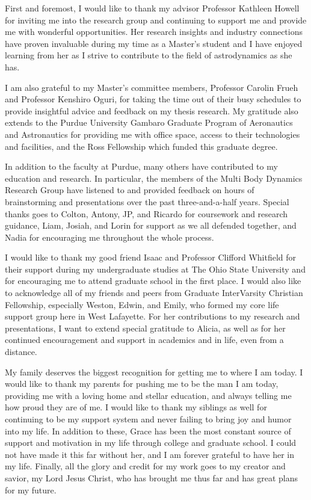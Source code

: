 {
\begin{acknowledgments}
    First and foremost, I would like to thank my advisor Professor Kathleen Howell for inviting me
    into the research group and continuing to support me and provide me with wonderful
    opportunities. Her research insights and industry connections have proven invaluable during my
    time as a Master's student and I have enjoyed learning from her as I strive to contribute to
    the field of astrodynamics as she has.

    I am also grateful to my Master's committee members, Professor Carolin Frueh and Professor
    Kenshiro Oguri, for taking the time out of their busy schedules to provide insightful advice
    and feedback on my thesis research. My gratitude also extends to the Purdue University Gambaro
    Graduate Program of Aeronautics and Astronautics for providing me with office space, access to
    their technologies and facilities, and the Ross Fellowship which funded this graduate degree.

    In addition to the faculty at Purdue, many others have contributed to my education and
    research. In particular, the members of the Multi Body Dynamics Research Group have listened
    to and provided feedback on hours of brainstorming and presentations over the past
    three-and-a-half years. Special thanks goes to Colton, Antony, JP, and Ricardo for coursework
    and research guidance, Liam, Josiah, and Lorin for support as we all defended together, and
    Nadia for encouraging me throughout the whole process.

    I would like to thank my good friend Isaac and Professor Clifford Whitfield for their support
    during my undergraduate studies at The Ohio State University and for encouraging me to attend
    graduate school in the first place. I would also like to acknowledge all of my friends and
    peers from Graduate InterVarsity Christian Fellowship, especially Weston, Edwin, and Emily,
    who formed my core life support group here in West Lafayette. For her contributions to my
    research and presentations, I want to extend special gratitude to Alicia, as well as for her
    continued encouragement and support in academics and in life, even from a distance.

    My family deserves the biggest recognition for getting me to where I am today. I would like to
    thank my parents for pushing me to be the man I am today, providing me with a loving home and
    stellar education, and always telling me how proud they are of me. I would like to thank my
    siblings as well for continuing to be my support system and never failing to bring joy and
    humor into my life. In addition to these, Grace has been the most constant source of support
    and motivation in my life through college and graduate school. I could not have made it this
    far without her, and I am forever grateful to have her in my life. Finally, all the glory and
    credit for my work goes to my creator and savior, my Lord Jesus Christ, who has brought me thus
    far and has great plans for my future.
\end{acknowledgments}
}